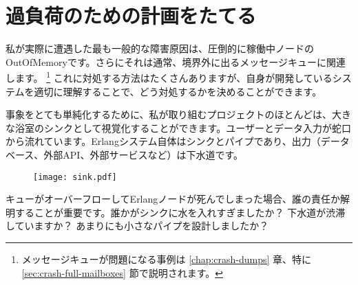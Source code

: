 \chapter{過負荷のための計画をたてる}
\label{chap:overload}

私が実際に遭遇した最も一般的な障害原因は、圧倒的に稼働中ノードのOutOfMemoryです。さらにそれは通常、境界外に出るメッセージキューに関連します。 \footnote{メッセージキューが問題になる事例は \ref{chap:crash-dumps} 章、特に \ref{sec:crash-full-mailboxes} 節で説明されます。} これに対処する方法はたくさんありますが、自身が開発しているシステムを適切に理解することで、どう対処するかを決めることができます。

事象をとても単純化するために、私が取り組むプロジェクトのほとんどは、大きな浴室のシンクとして視覚化することができます。ユーザーとデータ入力が蛇口から流れています。Erlangシステム自体はシンクとパイプであり、出力（データベース、外部API、外部サービスなど）は下水道です。

\begin{figure}[h!]
  \texttt{[image: sink.pdf]}%
  \centering%
   \label{fig:tracing-venn}
\end{figure}

キューがオーバーフローしてErlangノードが死んでしまった場合、誰の責任か解明することが重要です。誰かがシンクに水を入れすぎましたか？ 下水道が渋滞していますか？ あまりにも小さなパイプを設計しましたか？


